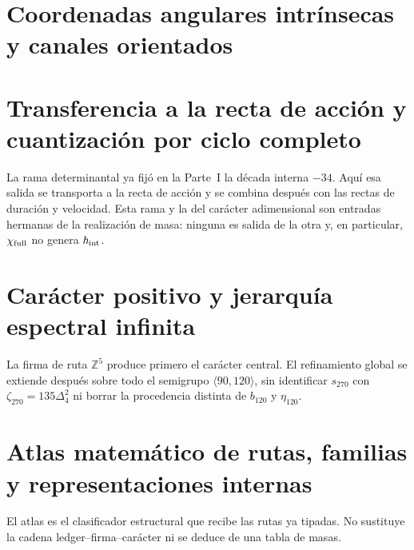 \chapter{Coordenadas angulares intrínsecas y canales orientados}
\label{chap:angulos-canales-rev7}
\HMTDemoteHeadings


\HMTRestoreHeadings

\chapter{Transferencia a la recta de acción y cuantización por ciclo completo}
\label{chap:transferencia-accion-rev7}
La rama determinantal ya fijó en la Parte~I la década interna
\(-34\). Aquí esa salida se transporta a la recta de acción y se combina
después con las rectas de duración y velocidad. Esta rama y la del carácter
adimensional son entradas hermanas de la realización de masa: ninguna es
salida de la otra y, en particular, \(\chi_{\rm full}\) no genera
\(\hbar_{\rm int}\).
\HMTDemoteHeadings


\HMTRestoreHeadings

\chapter{Carácter positivo y jerarquía espectral infinita}
\label{chap:caracter-torres-rev7}
La firma de ruta \(\mathbb Z^5\) produce primero el carácter central. El
refinamiento global se extiende después sobre todo el semigrupo
\(\langle90,120\rangle\), sin identificar \(s_{270}\) con
\(\zeta_{270}=135\Delta_4^2\) ni borrar la procedencia distinta de
\(b_{120}\) y \(\eta_{120}\).
\HMTDemoteHeadings
\def\HMTIncludeCharacterBlock{1}

\let\HMTIncludeCharacterBlock\undefined



\HMTRestoreHeadings

\chapter{Atlas matemático de rutas, familias y representaciones internas}
\label{chap:atlas-especies-rev7}
El atlas es el clasificador estructural que recibe las rutas ya tipadas. No
sustituye la cadena ledger--firma--carácter ni se deduce de una tabla de
masas.
\HMTDemoteHeadings
\def\HMTIncludeAtlasStructural{1}

\let\HMTIncludeAtlasStructural\undefined

\HMTRestoreHeadings

